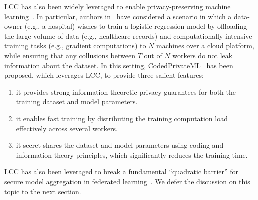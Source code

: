 LCC has also been widely leveraged to enable privacy-preserving machine learning~\cite{so2021codedprivateml,copML}. In particular, authors in~\cite{so2021codedprivateml} have considered a scenario in which a data-owner (e.g., a hospital) wishes to train a logistic regression model by offloading the large volume of data (e.g., healthcare records) and computationally-intensive training tasks (e.g., gradient computations) to $N$ machines over a cloud platform, while ensuring that any collusions between $T$ out of $N$ workers do not leak information about the dataset. In this setting, CodedPrivateML~\cite{so2021codedprivateml} has been proposed, which leverages LCC, to provide three salient features:
\begin{enumerate}
\item it provides strong information-theoretic privacy guarantees for both the training dataset and model parameters. 
\item it enables fast training by distributing the training computation load effectively across several workers.
\item it secret shares the dataset and model parameters using coding and information theory principles, which significantly reduces the training time. 
\end{enumerate}
LCC has also been leveraged to break a fundamental ``quadratic barrier'' for secure model aggregation in federated learning~\cite{so2021turbo}. We defer the discussion on this topic to the next section. 

